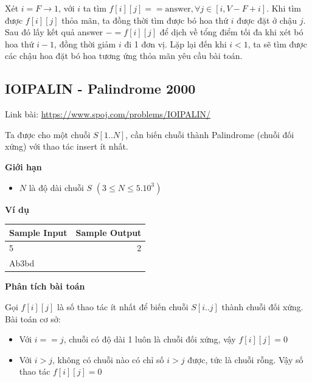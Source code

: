 \documentclass{article}
\begin{document}
Xét $i = F \rightarrow 1$, với $i$ ta tìm $f[i][j] == \text{answer}, \forall j \in [i, V - F + i]$. Khi tìm được $f[i][j]$ thỏa mãn, ta đồng thời tìm được bó hoa thứ $i$ được đặt ở chậu $j$. Sau đó lấy kết quả answer $-= f[i][j]$ để dịch về tổng điểm tối đa khi xét bó hoa thứ $i - 1$, đồng thời giảm $i$ đi 1 đơn vị. Lặp lại đến khi $i < 1$, ta sẽ tìm được các chậu hoa đặt bó hoa tương ứng thỏa mãn yêu cầu bài toán.
\subsection{IOIPALIN - Palindrome 2000}
Link bài: \url{https://www.spoj.com/problems/IOIPALIN/}

\begin{tcolorbox}[
    colback=blue!5,        %
    colframe=blue!75!black,%
    title={Đề bài}
]
Ta được cho một chuỗi $S[1..N]$, cần biến chuỗi thành Palindrome (chuỗi đối xứng) với thao tác insert ít nhất.
\end{tcolorbox}

\textbf{Giới hạn}
\begin{itemize}
    \item $N$ là độ dài chuỗi $S$ $(3 \leq N \leq 5.10^3)$
\end{itemize}

\textbf{Ví dụ}

\begin{table}[h]
    \centering
    \begin{tabular}{|l|r|}
        \hline
        \textbf{Sample Input} & \textbf{Sample Output} \\
        \hline
		5 & 2\\ 
		Ab3bd&  \\ 
		\hline
    \end{tabular}
\end{table}

\textbf{Phân tích bài toán}

Gọi $f[i][j]$ là số thao tác ít nhất để biến chuỗi $S[i..j]$ thành chuỗi đối xứng.\\

Bài toán cơ sở:
\begin{itemize}
    \item Với $i == j$, chuỗi có độ dài 1 luôn là chuỗi đối xứng, vậy $f[i][j] = 0$
    \item Với $i > j$, không có chuỗi nào có chỉ số $i > j$ được, tức là chuỗi rỗng. Vậy số thao tác $f[i][j] = 0$
\end{itemize}
\end{document}
